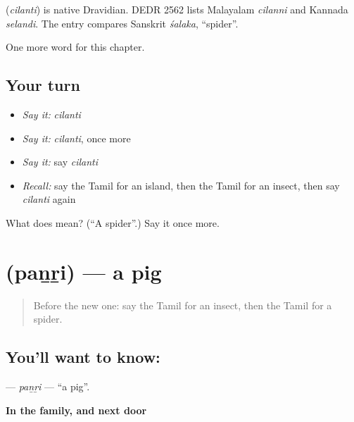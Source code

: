 \begin{cousinweb}
\textbf{} (\emph{cilanti}) is native Dravidian. DEDR 2562 lists Malayalam \emph{cilanni} and Kannada \emph{selandi}. The entry compares Sanskrit \emph{śalaka}, \textquotedblleft{}spider\textquotedblright{}.
\end{cousinweb}

\begin{grammarlens}[title={What you've built}]
One more word for this chapter.
\end{grammarlens}

\subsection*{Your turn}
\begin{itemize}
\raggedright
  \item \emph{Say it:} \emph{cilanti}
  \item \emph{Say it:} \emph{cilanti}, once more
  \item \emph{Say it:} say \emph{cilanti}
  \item \emph{Recall:} say the Tamil for an island, then the Tamil for an insect, then say \emph{cilanti} again
\end{itemize}

\begin{tcolorbox}[breakable,colback=teal!4,colframe=teal!35!black,title={Before you move on}]
What does  mean? (\textquotedblleft{}A spider\textquotedblright{}.) Say it once more.
\end{tcolorbox}
\section[\texorpdfstring{\ta{பன்றி} (paṉṟi)}{பன்றி (paṉṟi)}]{ (paṉṟi) — a pig}

\label{lesson:TA-C141-panri}



\begin{quote}
Before the new one: say the Tamil for an insect, then the Tamil for a spider.
\end{quote}

\subsection*{You'll want to know: }
\textbf{} — \emph{paṉṟi} — \textquotedblleft{}a pig\textquotedblright{}.

\textbf{In the family, and next door}

